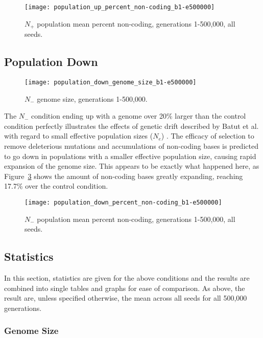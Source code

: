 \begin{figure}[h]
	\centering
	\texttt{[image: population\_up\_percent\_non-coding\_b1-e500000]}
	\caption[Population up percent non-coding]{$N_+$ population mean percent non-coding, generations 1-500,000, all seeds.}
	\label{fig:pop_up_perc_non-coding}
\end{figure}



\subsection{Population Down}

\begin{figure}[H]
	\centering
	\texttt{[image: population\_down\_genome\_size\_b1-e500000]}
	\caption[Population down genome size]{$N_-$ genome size, generations 1-500,000.}
	\label{fig:pop_down_genome_size}
\end{figure}

The $N_-$ condition ending up with a genome over 20\% larger than the control condition perfectly illustrates the effects of genetic drift described by Batut et al. with regard to small effective population sizes ($N_e$) \cite{Batut.2014}. The efficacy of selection to remove deleterious mutations and accumulations of non-coding bases is predicted to go down in populations with a smaller effective population size, causing rapid expansion of the genome size. This appears to be exactly what happened here, as Figure~\ref{fig:pop_down_perc_non-coding} shows the amount of non-coding bases greatly expanding, reaching 17.7\% over the control condition. 

\begin{figure}[H]
	\centering
	\texttt{[image: population\_down\_percent\_non-coding\_b1-e500000]}
	\caption[Population down percent non-coding]{$N_-$ population mean percent non-coding, generations 1-500,000, all seeds.}
	\label{fig:pop_down_perc_non-coding}
\end{figure}

\subsection{Statistics}
In this section, statistics are given for the above conditions and the results are combined into single tables and graphs for ease of comparison. As above, the result are, unless specified otherwise, the mean across all seeds for all 500,000 generations.
\subsubsection{Genome Size}\label{sec:genome_size}

